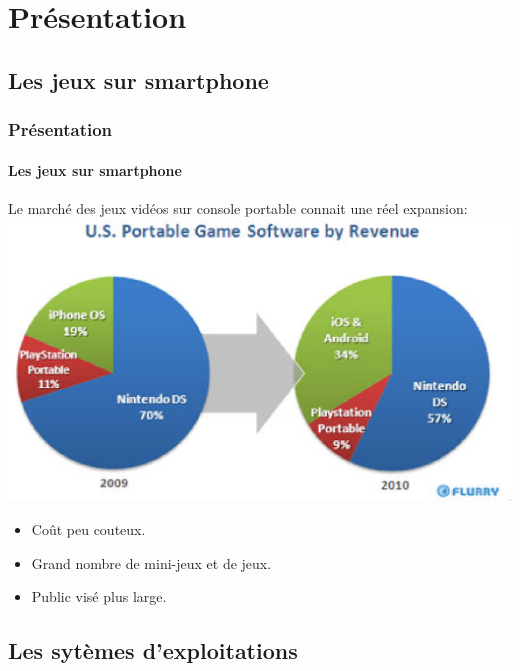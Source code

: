\section{Présentation}

\subsection{Les jeux sur smartphone}

\begin{frame}
\frametitle{Présentation}
\framesubtitle{Les jeux sur smartphone}
Le marché des jeux vidéos sur console portable connait une réel expansion: \\ \includegraphics[scale=0.4]{img/marche_console_portable.eps} 

\begin{itemize} 
		\item{Coût peu couteux.}
		\item{Grand nombre de mini-jeux et de jeux.}
		\item{Public visé plus large.}
\end{itemize}
\end{frame}



\subsection{Les sytèmes d'exploitations}


